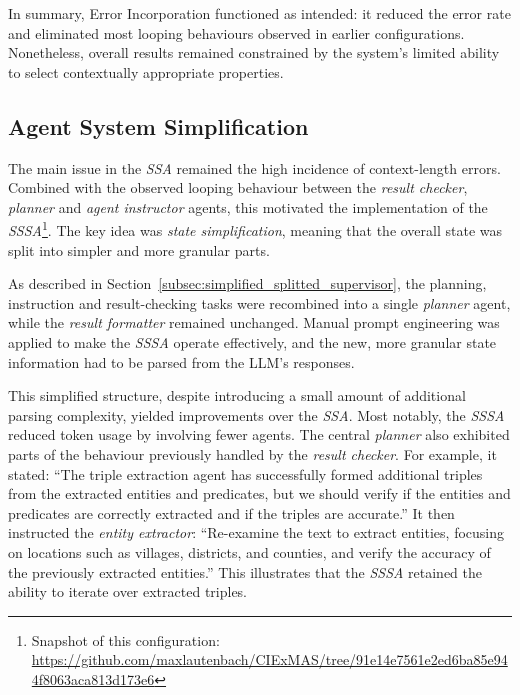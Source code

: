 \documentclass[a4paper,oneside,bibliography=totoc]{scrbook}
\begin{document}
In summary, Error Incorporation functioned as intended: it reduced the error rate and eliminated most looping behaviours observed in earlier configurations. Nonetheless, overall results remained constrained by the system’s limited ability to select contextually appropriate properties.

\subsection{Agent System Simplification}
\label{subsec:task_simplification_state_refinement}

The main issue in the \textit{\ac{SSA}} remained the high incidence of context-length errors. Combined with the observed looping behaviour between the \textit{result checker}, \textit{planner} and \textit{agent instructor} agents, this motivated the implementation of the \textit{\ac{SSSA}}\footnote{Snapshot of this configuration: \url{https://github.com/maxlautenbach/CIExMAS/tree/91e14e7561e2ed6ba85e944f8063aca813d173e6}}. The key idea was \textit{state simplification}, meaning that the overall state was split into simpler and more granular parts.

As described in Section~\ref{subsec:simplified_splitted_supervisor}, the planning, instruction and result-checking tasks were recombined into a single \textit{planner} agent, while the \textit{result formatter} remained unchanged. Manual prompt engineering was applied to make the \textit{\ac{SSSA}} operate effectively, and the new, more granular state information had to be parsed from the \ac{LLM}’s responses.

This simplified structure, despite introducing a small amount of additional parsing complexity, yielded improvements over the \textit{\ac{SSA}}. Most notably, the \textit{\ac{SSSA}} reduced token usage by involving fewer agents. The central \textit{planner} also exhibited parts of the behaviour previously handled by the \textit{result checker}. For example, it stated: \enquote{The triple extraction agent has successfully formed additional triples from the extracted entities and predicates, but we should verify if the entities and predicates are correctly extracted and if the triples are accurate.} It then instructed the \textit{entity extractor}: \enquote{Re-examine the text to extract entities, focusing on locations such as villages, districts, and counties, and verify the accuracy of the previously extracted entities.} This illustrates that the \textit{\ac{SSSA}} retained the ability to iterate over extracted triples.
\end{document}

